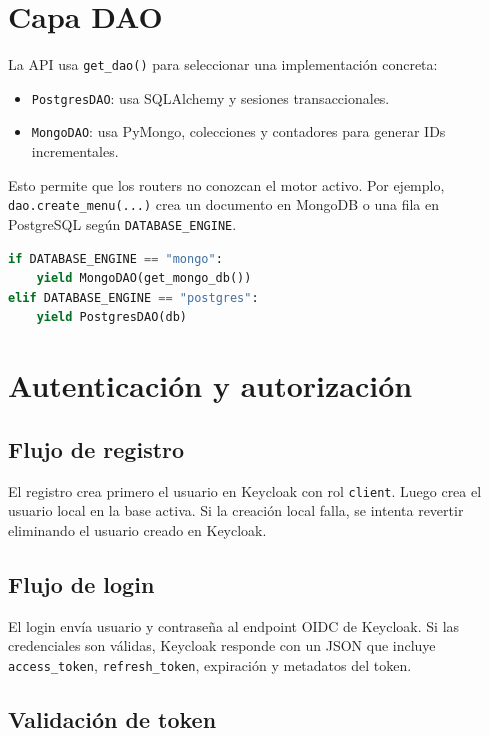 \documentclass[12pt,letterpaper]{article}
\def\codefile#1{\nolinkurl{#1}}
\begin{document}
\section{Capa DAO}

La API usa \codefile{get\_dao()} para seleccionar una implementación concreta:

\begin{itemize}
    \item \codefile{PostgresDAO}: usa SQLAlchemy y sesiones transaccionales.
    \item \codefile{MongoDAO}: usa PyMongo, colecciones y contadores para generar IDs incrementales.
\end{itemize}

Esto permite que los routers no conozcan el motor activo. Por ejemplo, \codefile{dao.create\_menu(...)} crea un documento en MongoDB o una fila en PostgreSQL según \codefile{DATABASE\_ENGINE}.

\begin{lstlisting}[language=Python,caption={Selección conceptual del DAO activo.}]
if DATABASE_ENGINE == "mongo":
    yield MongoDAO(get_mongo_db())
elif DATABASE_ENGINE == "postgres":
    yield PostgresDAO(db)
\end{lstlisting}

\section{Autenticación y autorización}

\subsection{Flujo de registro}

El registro crea primero el usuario en Keycloak con rol \codefile{client}. Luego crea el usuario local en la base activa. Si la creación local falla, se intenta revertir eliminando el usuario creado en Keycloak.

\subsection{Flujo de login}

El login envía usuario y contraseña al endpoint OIDC de Keycloak. Si las credenciales son válidas, Keycloak responde con un JSON que incluye \codefile{access\_token}, \codefile{refresh\_token}, expiración y metadatos del token.

\subsection{Validación de token}
\end{document}

